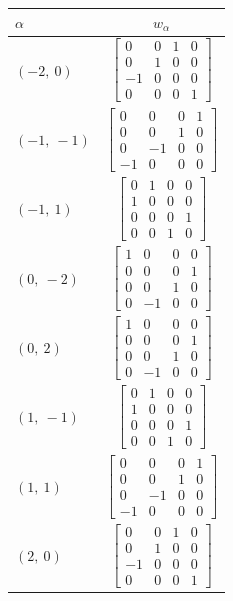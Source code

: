 \documentclass[11pt]{article}
\newcommand{\noi}{\noindent}
\theoremstyle{definition}
\begin{document}
\noi \noindent \begin{longtable}{|l|c|}
    \hline
    $\alpha$ & $w_\alpha$ \\
    \hline
    \endhead
    $\left( -2, \  0\right)$ & ${\left[\begin{matrix}0 & 0 & 1 & 0\\0 & 1 & 0 & 0\\-1 & 0 & 0 & 0\\0 & 0 & 0 & 1\end{matrix}\right]}$ \\
    \hline
    $\left( -1, \  -1\right)$ & ${\left[\begin{matrix}0 & 0 & 0 & 1\\0 & 0 & 1 & 0\\0 & -1 & 0 & 0\\-1 & 0 & 0 & 0\end{matrix}\right]}$ \\
    \hline
    $\left( -1, \  1\right)$ & ${\left[\begin{matrix}0 & 1 & 0 & 0\\1 & 0 & 0 & 0\\0 & 0 & 0 & 1\\0 & 0 & 1 & 0\end{matrix}\right]}$ \\
    \hline
    $\left( 0, \  -2\right)$ & ${\left[\begin{matrix}1 & 0 & 0 & 0\\0 & 0 & 0 & 1\\0 & 0 & 1 & 0\\0 & -1 & 0 & 0\end{matrix}\right]}$ \\
    \hline
    $\left( 0, \  2\right)$ & ${\left[\begin{matrix}1 & 0 & 0 & 0\\0 & 0 & 0 & 1\\0 & 0 & 1 & 0\\0 & -1 & 0 & 0\end{matrix}\right]}$ \\
    \hline
    $\left( 1, \  -1\right)$ & ${\left[\begin{matrix}0 & 1 & 0 & 0\\1 & 0 & 0 & 0\\0 & 0 & 0 & 1\\0 & 0 & 1 & 0\end{matrix}\right]}$ \\
    \hline
    $\left( 1, \  1\right)$ & ${\left[\begin{matrix}0 & 0 & 0 & 1\\0 & 0 & 1 & 0\\0 & -1 & 0 & 0\\-1 & 0 & 0 & 0\end{matrix}\right]}$ \\
    \hline
    $\left( 2, \  0\right)$ & ${\left[\begin{matrix}0 & 0 & 1 & 0\\0 & 1 & 0 & 0\\-1 & 0 & 0 & 0\\0 & 0 & 0 & 1\end{matrix}\right]}$ \\
    \hline
\end{longtable}
\end{document}
